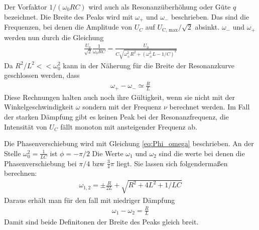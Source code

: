 Der Vorfaktor $1/(\omega_0 RC)$ wird auch als Resonanzüberhöhung oder Güte $q$ bezeichnet.
Die Breite des Peaks wird mit $\omega_+$ und $\omega_-$ beschrieben.
Das sind die Frequenzen, bei denen die Amplitude von $U_C$ auf $U_\text{C, max}/\sqrt{2}$ absinkt.
$\omega_-$ und $\omega_+$ werden nun durch die Gleichung
\begin{align*}
    \frac{U_0}{\sqrt{2}} \frac{1}{\omega_0 RC} = \frac{U_0}{C\sqrt{\omega_\pm^2 R^2 + \left(\omega_\pm^2 L - 1/C\right)^2}}
\end{align*}
Da $R^2/ L^2 << \omega_0^2$ kann in der Näherung für die Breite der Resonanzkurve geschlossen werden, dass
\begin{align}
    \omega_+ - \omega_- \simeq \frac{R}{L}
    \label{eq:omega_Breite_pm}
\end{align}
Diese Rechnungen halten auch noch ihre Gültigkeit, 
wenn sie nicht mit der Winkelgeschwindigkeit $\omega$ sondern mit der Frequenz $\nu$ berechnet werden.
Im Fall der starken Dämpfung gibt es keinen Peak bei der Resonanzfrequenz, 
die Intensität von $U_C$ fällt monoton mit ansteigender Frequenz ab.

Die Phasenverschiebung wird mit Gleichung \eqref{eq:Phi_omega} beschrieben.
An der Stelle $\omega_0^2 = \frac{1}{LC}$ ist $\phi = -\pi/2$
Die Werte $\omega_1$ und $\omega_2$ sind die werte bei denen die Phasenverschiebung bei $\pi/4$ bzw $\frac{3}{4}\pi$ liegt.
Sie lassen sich folgendermaßen berechnen:
\begin{align*}
    \omega_{1,2} = \pm \frac{R}{2L} + \sqrt{R^2+ 4L^2 +1/LC}
\end{align*}
Daraus erhält man für den fall mit niedriger Dämpfung
\begin{align}
    \omega_1 -\omega_2 = \frac{R}{L}
    \label{eq:omega_Breite_12}
\end{align}
Damit sind beide Definitonen der Breite des Peaks gleich breit.